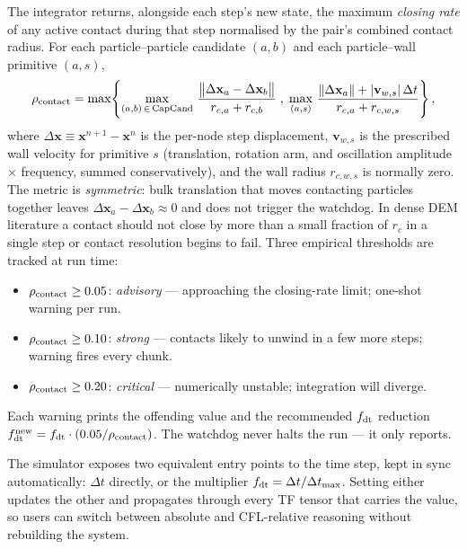 \documentclass[aps,pre,twocolumn,floatfix,longbibliography]{revtex4-2}
\begin{document}
The integrator returns, alongside each step's new state, the maximum
\emph{closing rate} of any active contact during that step normalised
by the pair's combined contact radius.  For each particle--particle
candidate $(a, b)$ and each particle--wall primitive $(a, s)$,
\begin{equation}
  \rho_{\rm contact}
  = \max\!\left\{
      \max_{(a,b)\,\in\,\text{CapCand}}\,
        \frac{\bigl\| \Delta \mathbf{x}_a - \Delta \mathbf{x}_b \bigr\|}
             {r_{c,a} + r_{c,b}}
      \;,\;
      \max_{(a,s)}\,
        \frac{\| \Delta \mathbf{x}_a \| + |\mathbf{v}_{w,s}|\,\Delta t}
             {r_{c,a} + r_{c,w,s}}
    \right\},
  \label{eq:rho_contact}
\end{equation}
where $\Delta \mathbf{x} \equiv \mathbf{x}^{n+1} - \mathbf{x}^{n}$ is
the per-node step displacement, $\mathbf{v}_{w,s}$ is the prescribed
wall velocity for primitive $s$ (translation, rotation arm, and
oscillation amplitude $\times$ frequency, summed conservatively), and
the wall radius $r_{c,w,s}$ is normally zero.  The metric is
\emph{symmetric}: bulk translation that moves contacting particles
together leaves $\Delta \mathbf{x}_a - \Delta \mathbf{x}_b \approx 0$
and does not trigger the watchdog.  In dense DEM literature a contact
should not close by more than a small fraction of $r_c$ in a single
step or contact resolution begins to fail.  Three empirical thresholds
are tracked at run time:
\begin{itemize}
\item $\rho_{\rm contact} \geq 0.05$: \emph{advisory} --- approaching
  the closing-rate limit; one-shot warning per run.
\item $\rho_{\rm contact} \geq 0.10$: \emph{strong} --- contacts likely
  to unwind in a few more steps; warning fires every chunk.
\item $\rho_{\rm contact} \geq 0.20$: \emph{critical} --- numerically
  unstable; integration will diverge.
\end{itemize}
Each warning prints the offending value and the recommended
$f_{\rm dt}$ reduction $f_{\rm dt}^{\rm new} = f_{\rm dt} \cdot
(0.05 / \rho_{\rm contact})$.  The watchdog never halts the run --- it
only reports.

The simulator exposes two equivalent entry points to the time step,
kept in sync automatically: $\Delta t$ directly, or the multiplier
$f_{\rm dt} = \Delta t / \Delta t_{\rm max}$.  Setting either updates
the other and propagates through every TF tensor that carries the
value, so users can switch between absolute and CFL-relative reasoning
without rebuilding the system.
\end{document}

